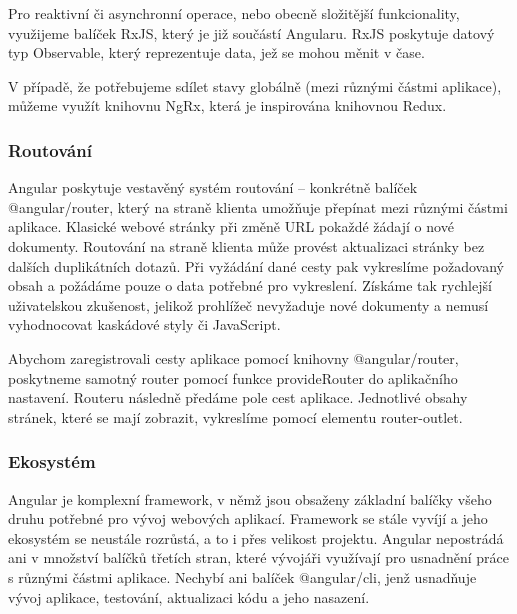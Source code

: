 Pro reaktivní či asynchronní operace, nebo obecně složitější funkcionality, využijeme balíček RxJS, který je již součástí Angularu. 
RxJS poskytuje datový typ Observable, který reprezentuje data, jež se mohou měnit v čase.\cite{angulario,rxjslibrary}

V případě, že potřebujeme sdílet stavy globálně (mezi různými částmi aplikace), můžeme využít knihovnu NgRx, která je inspirována knihovnou Redux.\cite{angularstatemanagement,ngrxlib}

\subsubsection{Routování}

Angular poskytuje vestavěný systém routování -- konkrétně balíček @angular/router, který na straně klienta umožňuje přepínat mezi různými částmi aplikace. 
Klasické webové stránky při změně URL pokaždé žádají o nové dokumenty. Routování na straně klienta může provést aktualizaci stránky bez dalších duplikátních dotazů. 
Při vyžádání dané cesty pak vykreslíme požadovaný obsah a požádáme pouze o data potřebné pro vykreslení. 
Získáme tak rychlejší uživatelskou zkušenost, jelikož prohlížeč nevyžaduje nové dokumenty a nemusí vyhodnocovat kaskádové styly či JavaScript.

Abychom zaregistrovali cesty aplikace pomocí knihovny @angular/router, poskytneme samotný router pomocí funkce provideRouter do aplikačního nastavení. 
Routeru následně předáme pole cest aplikace. Jednotlivé obsahy stránek, které se mají zobrazit, vykreslíme pomocí elementu router-outlet.\cite{angulardev,learningangular}

\subsubsection{Ekosystém}

Angular je komplexní framework, v němž jsou obsaženy základní balíčky všeho druhu potřebné pro vývoj webových aplikací. 
Framework se stále vyvíjí a jeho ekosystém se neustále rozrůstá, a to i přes velikost projektu. 
Angular nepostrádá ani v množství balíčků třetích stran, které vývojáři využívají pro usnadnění práce s různými částmi aplikace. 
Nechybí ani balíček @angular/cli, jenž usnadňuje vývoj aplikace, testování, aktualizaci kódu a jeho nasazení.\cite{angulardev,learningangular}